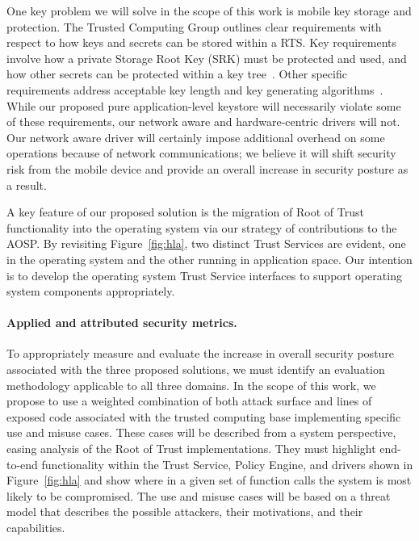 \documentclass[10pt,letterpaper]{article}
\begin{document}
One key problem we will solve in the scope of this work is mobile key storage and protection. The Trusted Computing Group outlines clear requirements with respect to how keys and secrets can be stored within a RTS. Key requirements involve how a private Storage Root Key (SRK) must be protected and used, and how other secrets can be protected within a key tree~\cite{TPMSpec}. Other specific requirements address acceptable key length and key generating algorithms~\cite{TPMSpec}. While our proposed pure application-level keystore will necessarily violate some of these requirements, our network aware and hardware-centric drivers will not. Our network aware driver will certainly impose additional overhead on some operations because of network communications; we believe it will shift security risk from the mobile device and provide an overall increase in security posture as a result.

A key feature of our proposed solution is the migration of Root of Trust functionality into the operating system via our strategy of contributions to the AOSP.  By revisiting Figure~\ref{fig:hla}, two distinct Trust Services are evident, one in the operating system and the other running in application space.  Our intention is to develop the operating system Trust Service interfaces to support operating system components appropriately.

\paragraph{Applied and attributed security metrics.} To appropriately measure and evaluate the increase in overall security posture associated with the three proposed solutions, we must identify an evaluation methodology applicable to all three domains. In the scope of this work, we propose to use a weighted combination of both attack surface and lines of exposed code associated with the trusted computing base implementing specific use and misuse cases. These cases will be described from a system perspective, easing analysis of the Root of Trust implementations. They must highlight end-to-end functionality within the Trust Service, Policy Engine, and drivers shown in Figure~\ref{fig:hla} and show where in a given set of function calls the system is most likely to be compromised. The use and misuse cases will be based on a threat model that describes the possible attackers, their motivations, and their capabilities.
\end{document}
